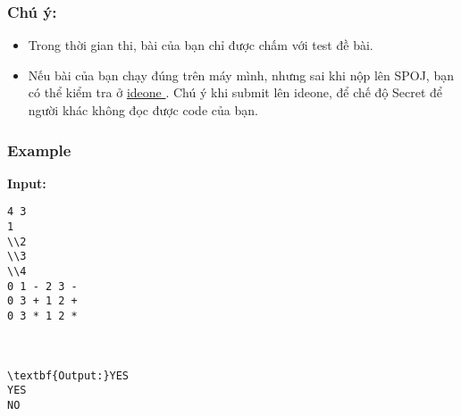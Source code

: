 \subsubsection{   Chú ý:  }
\begin{itemize}
	\item     Trong thời gian thi, bài của bạn chỉ được chấm với test đề bài.   
	\item     Nếu bài của bạn chạy đúng trên máy mình, nhưng sai khi nộp lên SPOJ, bạn có thể kiểm tra ở    \href{https://ideone.com}{     ideone    }    . Chú ý khi submit lên ideone, để chế độ Secret để người khác không đọc được code của bạn.   
\end{itemize}

\subsubsection{   Example  }

\textbf{    Input:   }
\begin{verbatim}
4 3
1
\\2
\\3
\\4
0 1 - 2 3 -
0 3 + 1 2 +
0 3 * 1 2 *



\textbf{Output:}YES
YES
NO\end{verbatim}

